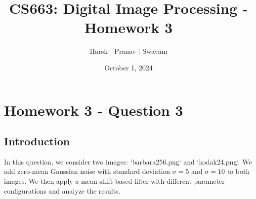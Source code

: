 \documentclass{article}
\title{CS663: Digital Image Processing - Homework 3}
\author{Harsh $\vert$ Pranav $\vert$ Swayam}
\date{October 1, 2024}
\begin{document}
\maketitle
\section{Homework 3 - Question 3}

\subsection{Introduction}
In this question, we consider two images: `barbara256.png` and `kodak24.png`. We add zero-mean Gaussian noise with standard deviation $\sigma = 5$ and $\sigma = 10$ to both images. We then apply a mean shift based filter with different parameter configurations and analyze the results.
\end{document}
